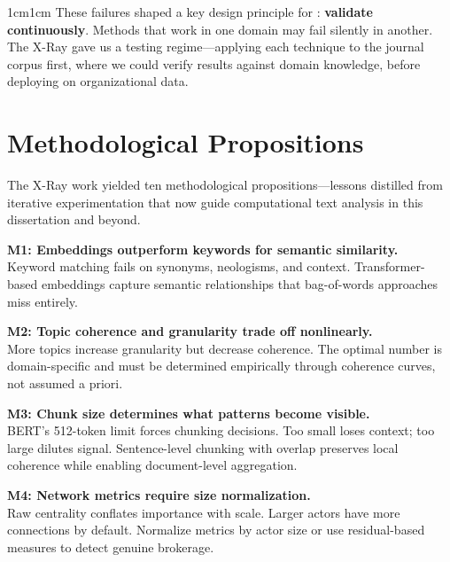 \documentclass[../main.tex]{subfiles}
\begin{document}
\begin{adjustwidth}{1cm}{1cm}
These failures shaped a key design principle for \RoleBox: \textbf{validate continuously}. Methods that work in one domain may fail silently in another. The X-Ray gave us a testing regime---applying each technique to the journal corpus first, where we could verify results against domain knowledge, before deploying on organizational data.

\vspace{0.8cm}

\section*{Methodological Propositions}

The X-Ray work yielded ten methodological propositions---lessons distilled from iterative experimentation that now guide computational text analysis in this dissertation and beyond.

\begin{propositionbox}
\textbf{M1: Embeddings outperform keywords for semantic similarity.}\\[2pt]
Keyword matching fails on synonyms, neologisms, and context. Transformer-based embeddings capture semantic relationships that bag-of-words approaches miss entirely.
\end{propositionbox}

\begin{propositionbox}
\textbf{M2: Topic coherence and granularity trade off nonlinearly.}\\[2pt]
More topics increase granularity but decrease coherence. The optimal number is domain-specific and must be determined empirically through coherence curves, not assumed a priori.
\end{propositionbox}

\begin{propositionbox}
\textbf{M3: Chunk size determines what patterns become visible.}\\[2pt]
BERT's 512-token limit forces chunking decisions. Too small loses context; too large dilutes signal. Sentence-level chunking with overlap preserves local coherence while enabling document-level aggregation.
\end{propositionbox}

\begin{propositionbox}
\textbf{M4: Network metrics require size normalization.}\\[2pt]
Raw centrality conflates importance with scale. Larger actors have more connections by default. Normalize metrics by actor size or use residual-based measures to detect genuine brokerage.
\end{propositionbox}


\end{adjustwidth}
\end{document}
